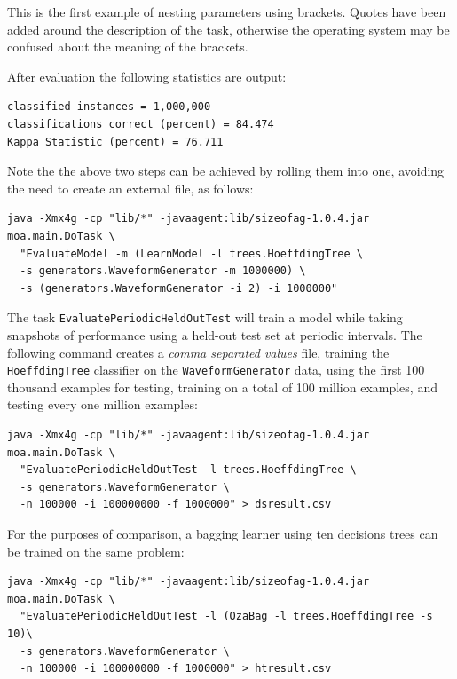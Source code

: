 \documentclass[a4paper,12pt,twoside]{book}
\begin{document}
This is the first example of nesting parameters using brackets. Quotes have been added around the description of the task, otherwise the operating system may be confused about the meaning of the brackets.

After evaluation the following statistics are output:

\begin{footnotesize}\begin{verbatim}
classified instances = 1,000,000
classifications correct (percent) = 84.474
Kappa Statistic (percent) = 76.711
\end{verbatim}\end{footnotesize}

Note the the above two steps can be achieved by rolling them into one, avoiding the need to create an external file, as follows:

\begin{footnotesize}\begin{verbatim}
java -Xmx4g -cp "lib/*" -javaagent:lib/sizeofag-1.0.4.jar moa.main.DoTask \
  "EvaluateModel -m (LearnModel -l trees.HoeffdingTree \
  -s generators.WaveformGenerator -m 1000000) \
  -s (generators.WaveformGenerator -i 2) -i 1000000"
\end{verbatim}\end{footnotesize}

The task \verb+EvaluatePeriodicHeldOutTest+ will train a model while taking snapshots of performance using a held-out test set at periodic intervals.
The following command creates a {\em comma separated values} file, training the \verb+HoeffdingTree+ classifier on the \verb+WaveformGenerator+ data, using the first 100 thousand examples for testing, training on a total of 100 million examples, and testing every one million examples:

\begin{footnotesize}\begin{verbatim}
java -Xmx4g -cp "lib/*" -javaagent:lib/sizeofag-1.0.4.jar moa.main.DoTask \
  "EvaluatePeriodicHeldOutTest -l trees.HoeffdingTree \
  -s generators.WaveformGenerator \
  -n 100000 -i 100000000 -f 1000000" > dsresult.csv
\end{verbatim}\end{footnotesize}

  For the purposes of comparison, a bagging learner using ten decisions trees can be trained on
the same problem:
\begin{footnotesize}\begin{verbatim}
java -Xmx4g -cp "lib/*" -javaagent:lib/sizeofag-1.0.4.jar moa.main.DoTask \
  "EvaluatePeriodicHeldOutTest -l (OzaBag -l trees.HoeffdingTree -s 10)\
  -s generators.WaveformGenerator \
  -n 100000 -i 100000000 -f 1000000" > htresult.csv
\end{verbatim}\end{footnotesize}
\end{document}
